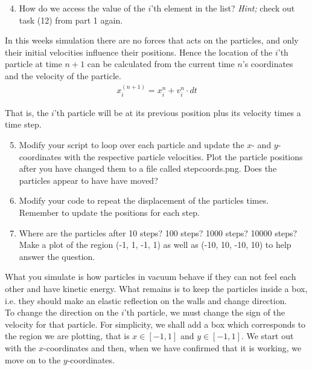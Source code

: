\documentclass{article}
\begin{document}
\begin{enumerate}
  \setcounter{enumi}{3}
  \item How do we access the value of the $i$'th element in the  list?
      {\em Hint;} check out task (12) from part 1 again.

\end{enumerate}

In this weeks simulation there are no forces that acts on the particles,
and only their initial velocities influence their positions.
Hence the location of the $i$'th particle at time $n+1$ can be
calculated from the current time $n$'s coordinates and the velocity of the
particle.
\begin{align}
  x_i^{(n+1)} = x^n_i + v_{i}^n \cdot dt
\end{align}

That is, the $i$'th particle will be at its previous position plus its
velocity times a time step.

\begin{enumerate}
  \setcounter{enumi}{4}
  \item
    Modify your script to loop over each particle and update the $x$- and
    $y$-coordinates with the respective particle velocities.
    Plot the particle positions after you have changed them
    to a file called stepcoords.png. Does the particles appear to have have moved?

  \item Modify your code to repeat the displacement of the particles  times.
      Remember to update the positions for each step.

  \item Where are the particles after 10 steps? 100 steps? 1000 steps? 10000 steps?
    Make a plot of the region (-1, 1, -1, 1) as well as (-10, 10, -10, 10) to
    help answer the question.

\end{enumerate}

What you simulate is how particles in vacuum behave if they can not feel
each other and have kinetic energy. What remains is to keep the particles
inside a box, i.e. they should make an elastic reflection on the walls and
change direction. \\

To change the direction on the $i$'th particle, we must change
the sign of the velocity for that particle. For simplicity, we shall add a box
which corresponds to the region we are plotting, that is $x \in [-1,1]$ 
and $y \in [-1,1]$.
We start out with the $x$-coordinates and then, when we
have confirmed that it is working, we move on to the $y$-coordinates.
\end{document}
